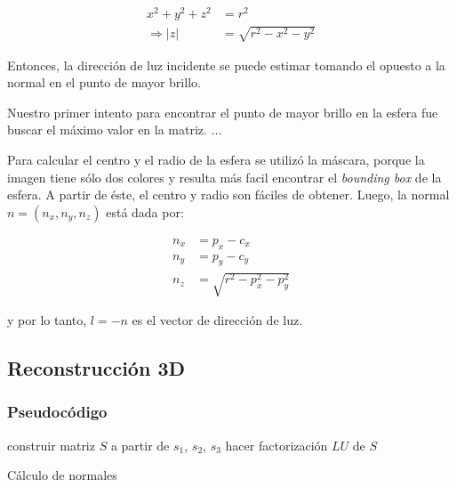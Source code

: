 \documentclass{article}
\begin{document}
\begin{align*}
    x^2 + y^2 + z^2 &= r^2 \\
    \Rightarrow |z| &= \sqrt{r^2 - x^2 - y^2}
\end{align*}

Entonces, la dirección de luz incidente se puede estimar tomando el opuesto a la normal en el punto de mayor brillo.

Nuestro primer intento para encontrar el punto de mayor brillo en la esfera fue buscar el máximo valor en la matriz. ...

Para calcular el centro y el radio de la esfera se utilizó la máscara, porque la imagen tiene sólo dos colores y resulta más facil encontrar el \textit{bounding box} de la esfera.  A partir de éste, el centro y radio son fáciles de obtener.  Luego, la normal $n = (n_x, n_y, n_z)$ está dada por:

\begin{align*}
    n_x &= p_x - c_x \\
    n_y &= p_y - c_y \\
    n_z &= \sqrt{r^2 - p_x^2 - p_y^2}
\end{align*}

y por lo tanto, $l = -n$ es el vector de dirección de luz.

%

\subsection{Reconstrucción 3D}

\subsubsection{Pseudocódigo}

\begin{algorithm}[H]
\SetAlgoLined
{}
  construir matriz $S$ a partir de $s_1$, $s_2$, $s_3$\;
  hacer factorización $LU$ de $S$\;
  \caption{Cálculo de normales}
\end{algorithm}
\end{document}
